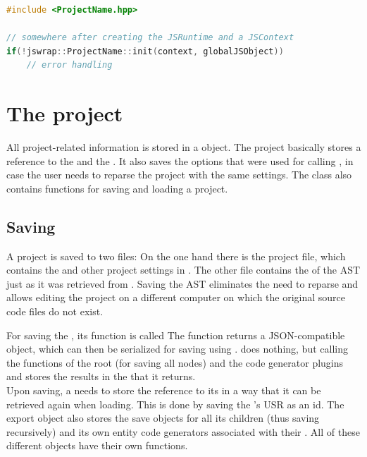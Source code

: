 \SingleSpacing
\begin{lstlisting}[language=C++, caption=Initializing the wrapped elements]
#include <ProjectName.hpp>

// somewhere after creating the JSRuntime and a JSContext
if(!jswrap::ProjectName::init(context, globalJSObject))
	// error handling
\end{lstlisting}
\OnehalfSpacing

\section{The project}
\label{sec:Project}

All project-related information is stored in a  object. The project basically stores a reference to the  and the . It also saves the options that were used for calling , in case the user needs to reparse the project with the same settings. The  class also contains functions for saving and loading a project.

\subsection{Saving}

A project is saved to two files: On the one hand there is the project file, which contains the  and other project settings in . The other file contains the  of the  AST just as it was retrieved from . Saving the  AST eliminates the need to reparse and allows editing the project on a different computer on which the original source code files do not exist.

For saving the , its  function is called The function returns a JSON-compatible object, which can then be serialized for saving using .  does nothing, but calling the  functions of the root \linebreak{} (for saving all nodes) and the code generator plugins and stores the results in the  that it returns.\\
Upon saving, a  needs to store the reference to its  in a way that it can be retrieved again when loading. This is done by saving the 's USR as an id. The export object also stores the save objects for all its children (thus saving recursively) and its own entity code generators associated with their . All of these different  objects have their own  functions.

